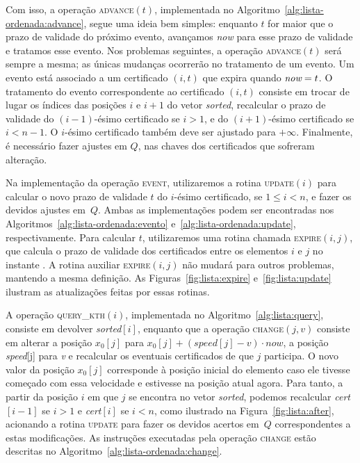 Com isso, a operação \textsc{advance}$(t)$, implementada no
Algoritmo~\ref{alg:lista-ordenada:advance}, segue uma ideia bem simples: enquanto
$t$ for maior que o prazo de validade do próximo evento, avançamos
\textit{now} para esse prazo de validade e tratamos esse evento.
Nos problemas seguintes, a operação \textsc{advance}$(t)$ será sempre a
mesma;
as únicas mudanças ocorrerão no tratamento de um evento.
Um evento está associado a um certificado $(i, t)$ que expira quando
$\textit{now} = t$.
O tratamento do evento correspondente ao certificado $(i, t)$ consiste em trocar de lugar os
índices das posições $i$ e $i + 1$ do vetor \textit{sorted}, recalcular o prazo de validade do
$(i-1)$-ésimo certificado se $i > 1$, e do $(i + 1)$-ésimo
certificado se $i < n - 1$.
O $i$-ésimo certificado também deve ser ajustado para $+\infty$.
Finalmente, é necessário fazer ajustes em $Q$, nas chaves dos certificados que sofreram
alteração.



Na implementação da operação \textsc{event}, utilizaremos a rotina
\textsc{update}$(i)$ para calcular o novo prazo de validade $t$ do
$i$-ésimo certificado, se $1 \leq i < n$, e fazer os devidos ajustes
em~$Q$.
Ambas as implementações podem ser encontradas nos Algoritmos~\ref{alg:lista-ordenada:evento}
e~\ref{alg:lista-ordenada:update}, respectivamente.
Para calcular $t$, utilizaremos uma rotina chamada \textsc{expire}$(i,
j)$, que calcula o prazo de validade dos certificados entre os
elementos $i$ e $j$ no instante \now.
A rotina auxiliar \textsc{expire}$(i, j)$ não mudará para outros problemas, mantendo a
mesma definição.
As Figuras~\ref{fig:lista:expire} e~\ref{fig:lista:update} ilustram as atualizações feitas por
essas rotinas.









A operação \textsc{query\_kth}$(i)$, implementada no Algoritmo~\ref{alg:lista:query}, consiste em
devolver \textit{sorted}$[i]$, enquanto que a operação \textsc{change}$(j, v)$ consiste em alterar
a posição $x_0[j]$ para $x_0[j] + (\mathit{speed}[j] - v)\cdot now$,
a posição \textit{speed}[j] para \textit{v} e recalcular os
eventuais certificados de que $j$ participa.
O novo valor da posição $x_0[j]$ corresponde à posição inicial do elemento caso ele tivesse
começado com essa velocidade e estivesse na posição atual agora.
Para tanto, a partir da posição $i$ em que $j$ se encontra no vetor
\textit{sorted}, podemos recalcular \textit{cert}$[i - 1]$ se $i >
1$ e \textit{cert}$[i]$ se $i < n$, como ilustrado na Figura~\ref{fig:lista:after}, acionando a
rotina \textsc{update} para fazer
os devidos acertos em~$Q$ correspondentes a estas modificações.
As instruções executadas pela operação \textsc{change} estão descritas
no Algoritmo~\ref{alg:lista-ordenada:change}.

